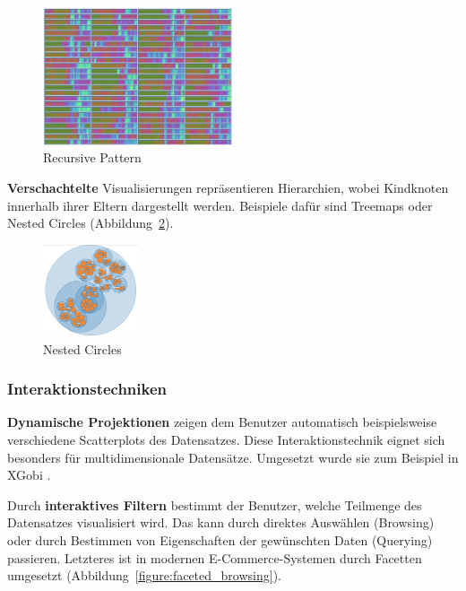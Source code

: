 \documentclass[
	headsepline,
	footsepline,
	fontsize=12pt,
	bibliography=totoc
]{scrbook}
\begin{document}
\begin{figure}[htbp]
   \centering
   \includegraphics[width=0.5\textwidth]{images/grundlagen-recursive_pattern.png}
   \caption{Recursive Pattern}
   \label{figure:recursive_pattern}
\end{figure}


\textbf{Verschachtelte} Visualisierungen repräsentieren Hierarchien, wobei Kindknoten innerhalb ihrer Eltern dargestellt werden. Beispiele dafür sind Treemaps \cite{Shneiderman1992} oder Nested Circles (Abbildung~\ref{figure:nested_circles}).

\begin{figure}[htbp]
   \centering
   \includegraphics[width=0.25\textwidth]{images/grundlagen-nested_circles.png}
   \caption{Nested Circles}
   \label{figure:nested_circles}
\end{figure}

\subsubsection{Interaktionstechniken}
\label{section:standderforschung:grundlagen:informationsvisualisierung:interaktionstechniken}


\textbf{Dynamische Projektionen} zeigen dem Benutzer automatisch beispielsweise verschiedene Scatterplots des Datensatzes. Diese Interaktionstechnik eignet sich besonders für multidimensionale Datensätze. Umgesetzt wurde sie zum Beispiel in XGobi \cite{Swayne1998}.


Durch \textbf{interaktives Filtern} bestimmt der Benutzer, welche Teilmenge des Datensatzes visualisiert wird. Das kann durch direktes Auswählen (Browsing) oder durch Bestimmen von Eigenschaften der gewünschten Daten (Querying) passieren. Letzteres ist in modernen E-Commerce-Systemen durch Facetten \cite{Yee2003} umgesetzt (Abbildung~\ref{figure:faceted_browsing}).
\end{document}

